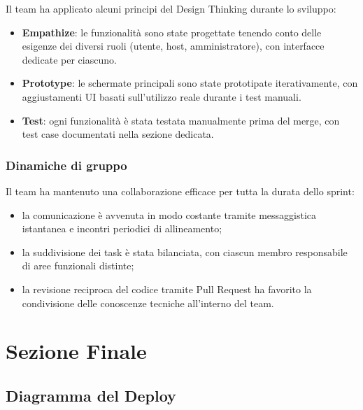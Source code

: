 \documentclass[a4paper,12pt]{article}
\begin{document}
Il team ha applicato alcuni principi del Design Thinking durante lo sviluppo:

\begin{itemize}
  \item \textbf{Empathize}: le funzionalità sono state progettate tenendo conto
        delle esigenze dei diversi ruoli (utente, host, amministratore), con
        interfacce dedicate per ciascuno.
  \item \textbf{Prototype}: le schermate principali sono state prototipate
        iterativamente, con aggiustamenti UI basati sull'utilizzo reale durante
        i test manuali.
  \item \textbf{Test}: ogni funzionalità è stata testata manualmente prima del
        merge, con test case documentati nella sezione dedicata.
\end{itemize}

\subsubsection{Dinamiche di gruppo}

Il team ha mantenuto una collaborazione efficace per tutta la durata dello sprint:

\begin{itemize}
  \item la comunicazione è avvenuta in modo costante tramite messaggistica
        istantanea e incontri periodici di allineamento;
  \item la suddivisione dei task è stata bilanciata, con ciascun membro
        responsabile di aree funzionali distinte;
  \item la revisione reciproca del codice tramite Pull Request ha favorito
        la condivisione delle conoscenze tecniche all'interno del team.
\end{itemize}

\section{Sezione Finale}

\subsection{Diagramma del Deploy}
\end{document}
